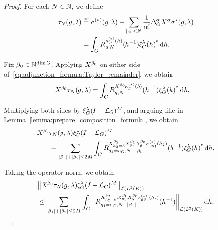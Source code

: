 \begin{proof}
    For each $N \in \mathbb{N}$,
    we define
    \begin{align}
        \tau_N(g, \lambda) &\defeq
        \sigma^{(*)}(g, \lambda)
        - \sum_{\abs \alpha \leq N} \frac 1 {\alpha!} \DifferenceOperatorOrder \alpha \LeftDifferentialOperator \alpha \adj \sigma(g, \lambda) \notag\\
        &= \int_\Group \TaylorRemainder {\kappa_{g \dummy}^{(*)}(h)} g N (h^{-1}) \adj{\Rep \lambda (h)} \dd h.
        \label{eq:adjunction_formula:Taylor_remainder}
    \end{align}

    Fix $\beta_0 \in \mathbb{N}^{\dim G}$.
    Applying $\LeftDifferentialOperator {\beta_0}$ on either side of~\eqref{eq:adjunction_formula:Taylor_remainder},
    we obtain
    \begin{align*}
        \LeftDifferentialOperator {\beta_0} \tau_N (g, \lambda)
        &= \int_\Group \TaylorRemainder {\LeftDifferentialOperator {\beta_0} \kappa_{g \dummy}^{(*)}(h)} g N (h^{-1}) \adj{\Rep \lambda (h)} \dd h.
    \end{align*}

    Multiplying both sides by $\xi^{\lambda}_{G} (I - {\mathcal{L}_{G}})^{M}$,
    and arguing like in Lemma~\ref{lemma:prepare_composition_formula},
    we obtain
    \begin{align*}
        \LeftDifferentialOperator {\beta_0} &\tau_N (g, \lambda) \Rep \lambda \BesselPotentialSquared M\\
        &= \sum_{\abs {\beta_1} + \abs {\beta_2} \leq 2M} \int_\Group \TaylorRemainder {\RightDifferentialOperator [h_2 = h] {\beta_2} \LeftDifferentialOperator [g_1] {\beta_1} \LeftDifferentialOperator [g] {\beta_0} \kappa_{g g_1}^{(*)}(h_2)} {g_1 = e_\Group} {N - \abs {\beta_1}} (h^{-1}) \adj{\Rep \lambda (h)} \dd h.
    \end{align*}

    Taking the operator norm,
    we obtain
    \begin{align*}
        &\norm [\Lin {\Lebesgue 2 \CompactGroup}] {%
            \LeftDifferentialOperator {\beta_0} \tau_N (g, \lambda) \Rep \lambda \BesselPotentialSquared M
        }\\
        &\leq \sum_{\abs {\beta_1} + \abs {\beta_2} \leq 2M} \int_\Group
        \norm [\Lin {\Lebesgue 2 \CompactGroup}] {%
            \TaylorRemainder {\RightDifferentialOperator [h_2 = h] {\beta_2} \LeftDifferentialOperator [g_1] {\beta_1} \LeftDifferentialOperator [g] {\beta_0} \kappa_{g g_1}^{(*)}(h_2)} {g_1 = e_\Group} {N - \abs {\beta_1}} (h^{-1})
        }
        \dd h.
    \end{align*}


\end{proof}
